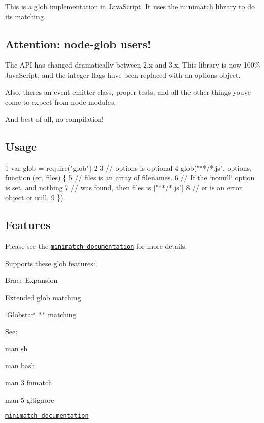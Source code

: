 This is a glob implementation in Java\+Script. It uses the {\ttfamily minimatch} library to do its matching.

\subsection*{Attention\+: node-\/glob users!}

The A\+P\+I has changed dramatically between 2.\+x and 3.\+x. This library is now 100\% Java\+Script, and the integer flags have been replaced with an options object.

Also, there\textquotesingle{}s an event emitter class, proper tests, and all the other things you\textquotesingle{}ve come to expect from node modules.

And best of all, no compilation!

\subsection*{Usage}


\begin{DoxyCode}
1 var glob = require("glob")
2 
3 // options is optional
4 glob("**/*.js", options, function (er, files) \{
5   // files is an array of filenames.
6   // If the `nonull` option is set, and nothing
7   // was found, then files is ["**/*.js"]
8   // er is an error object or null.
9 \})
\end{DoxyCode}


\subsection*{Features}

Please see the \href{https://github.com/isaacs/minimatch}{\tt minimatch documentation} for more details.

Supports these glob features\+:


\begin{DoxyItemize}
\item Brace Expansion
\item Extended glob matching
\item \char`\"{}\+Globstar\char`\"{} {\ttfamily $\ast$$\ast$} matching
\end{DoxyItemize}

See\+:


\begin{DoxyItemize}
\item {\ttfamily man sh}
\item {\ttfamily man bash}
\item {\ttfamily man 3 fnmatch}
\item {\ttfamily man 5 gitignore}
\item \href{https://github.com/isaacs/minimatch}{\tt minimatch documentation}
\end{DoxyItemize}

